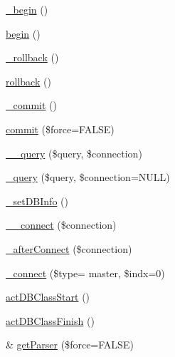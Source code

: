 \begin{DoxyCompactItemize}
\hyperlink{classDB_ab081086c9f44c12dce30d78e00141986}{\+\_\+begin} ()
\item 
\hyperlink{classDB_a41aea6b3a6787467fcfd16d28a302c54}{begin} ()
\item 
\hyperlink{classDB_ac537ae2001731b709a4b60992b04275b}{\+\_\+rollback} ()
\item 
\hyperlink{classDB_a1fb6903379bc241fd318b980b9e30882}{rollback} ()
\item 
\hyperlink{classDB_ae6b44dc80d78b7f73cb6741ff0d63399}{\+\_\+commit} ()
\item 
\hyperlink{classDB_a9e84ef91b522b1cd4d1f0f9a3fe3a57a}{commit} (\$force=F\+A\+L\+S\+E)
\item 
\hyperlink{classDB_a9e93ad499d34fefc40686d35ed9bf18f}{\+\_\+\+\_\+query} (\$query, \$connection)
\item 
\hyperlink{classDB_a740ea0f536b5ffacabf31b3a7473f5a7}{\+\_\+query} (\$query, \$connection=N\+U\+L\+L)
\item 
\hyperlink{classDB_a92f2478aeb03b00432332ad4e4a3d700}{\+\_\+set\+D\+B\+Info} ()
\item 
\hyperlink{classDB_a398b5d8142cab5920d3e037b4f22830e}{\+\_\+\+\_\+connect} (\$connection)
\item 
\hyperlink{classDB_ae9511581ab1229970e061e599b0f2f94}{\+\_\+after\+Connect} (\$connection)
\item 
\hyperlink{classDB_aaa2d517ff3b233e36c7873f288cb38ba}{\+\_\+connect} (\$type= \textquotesingle{}master\textquotesingle{}, \$indx=0)
\item 
\hyperlink{classDB_a5aa10d0d5f40cbd7c9b20a84b1c1c307}{act\+D\+B\+Class\+Start} ()
\item 
\hyperlink{classDB_abcdbf61ef5e7c96725c7ea2781f165f4}{act\+D\+B\+Class\+Finish} ()
\item 
\& \hyperlink{classDB_ac1222f2e7a1aae0fcd7d9e906a7a96ba}{get\+Parser} (\$force=F\+A\+L\+S\+E)
\end{DoxyCompactItemize}
